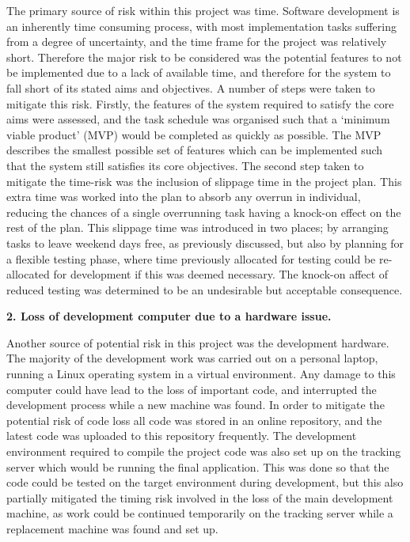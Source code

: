 The primary source of risk within this project was time. Software development is an inherently time consuming process, with most implementation tasks suffering from a degree of uncertainty, and the time frame for the project was relatively short. Therefore the major risk to be considered was the potential features to not be implemented due to a lack of available time, and therefore for the system to fall short of its stated aims and objectives. A number of steps were taken to mitigate this risk. Firstly, the features of the system required to satisfy the core aims were assessed, and the task schedule was organised such that a `minimum viable product' (MVP) would be completed as quickly as possible. The MVP describes the smallest possible set of features which can be implemented such that the system still satisfies its core objectives. The second step taken to mitigate the time-risk was the inclusion of slippage time in the project plan. This extra time was worked into the plan to absorb any overrun in individual, reducing the chances of a single overrunning task having a knock-on effect on the rest of the plan. This slippage time was introduced in two places; by arranging tasks to leave weekend days free, as previously discussed, but also by planning for a flexible testing phase, where time previously allocated for testing could be re-allocated for development if this was deemed necessary. The knock-on affect of reduced testing was determined to be an undesirable but acceptable consequence.

\noindent\textbf{2. Loss of development computer due to a hardware issue.}

Another source of potential risk in this project was the development hardware. The majority of the development work was carried out on a personal laptop, running a Linux operating system in a virtual environment. Any damage to this computer could have lead to the loss of important code, and interrupted the development process while a new machine was found. In order to mitigate the potential risk of code loss all code was stored in an online repository, and the latest code was uploaded to this repository frequently. The development environment required to compile the project code was also set up on the tracking server which would be running the final application. This was done so that the code could be tested on the target environment during development, but this also partially mitigated the timing risk involved in the loss of the main development machine, as work could be continued temporarily on the tracking server while a replacement machine was found and set up.

